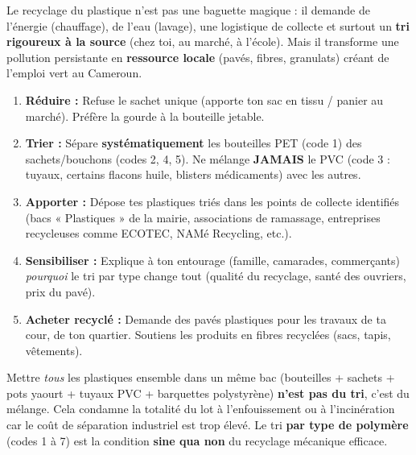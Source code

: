 \documentclass[11pt]{article}
\newcounter{popsec}
\newcounter{popsub}
\newcommand{\courssub}[1]{%
  \stepcounter{popsub}%
  \par\vspace{9pt}\noindent{\popxbold\fontsize{11.5}{13}\selectfont\color{popink}{\color{poporange}\thepopsec.\thepopsub}\hspace{6pt}#1}\par\nopagebreak\vspace{4pt}
}
\begin{document}
\courssub{Synthèse et ouverture citoyenne}

Le recyclage du plastique n'est pas une baguette magique : il demande de l'énergie (chauffage), de l'eau (lavage), une logistique de collecte et surtout un \textbf{tri rigoureux à la source} (chez toi, au marché, à l'école). Mais il transforme une pollution persistante en \textbf{ressource locale} (pavés, fibres, granulats) créant de l'emploi vert au Cameroun.

\begin{methode}
\begin{enumerate}
    \item \textbf{Réduire :} Refuse le sachet unique (apporte ton sac en tissu / panier au marché). Préfère la gourde à la bouteille jetable.
    \item \textbf{Trier :} Sépare \textbf{systématiquement} les bouteilles PET (code 1) des sachets/bouchons (codes 2, 4, 5). Ne mélange \textbf{JAMAIS} le PVC (code 3 : tuyaux, certains flacons huile, blisters médicaments) avec les autres.
    \item \textbf{Apporter :} Dépose tes plastiques triés dans les points de collecte identifiés (bacs « Plastiques » de la mairie, associations de ramassage, entreprises recycleuses comme ECOTEC, NAMé Recycling, etc.).
    \item \textbf{Sensibiliser :} Explique à ton entourage (famille, camarades, commerçants) \emph{pourquoi} le tri par type change tout (qualité du recyclage, santé des ouvriers, prix du pavé).
    \item \textbf{Acheter recyclé :} Demande des pavés plastiques pour les travaux de ta cour, de ton quartier. Soutiens les produits en fibres recyclées (sacs, tapis, vêtements).
\end{enumerate}
\end{methode}

\begin{attention}
Mettre \emph{tous} les plastiques ensemble dans un même bac (bouteilles + sachets + pots yaourt + tuyaux PVC + barquettes polystyrène) \textbf{n'est pas du tri}, c'est du mélange. Cela condamne la totalité du lot à l'enfouissement ou à l'incinération car le coût de séparation industriel est trop élevé. Le tri \textbf{par type de polymère} (codes 1 à 7) est la condition \textbf{sine qua non} du recyclage mécanique efficace.
\end{attention}
\end{document}
